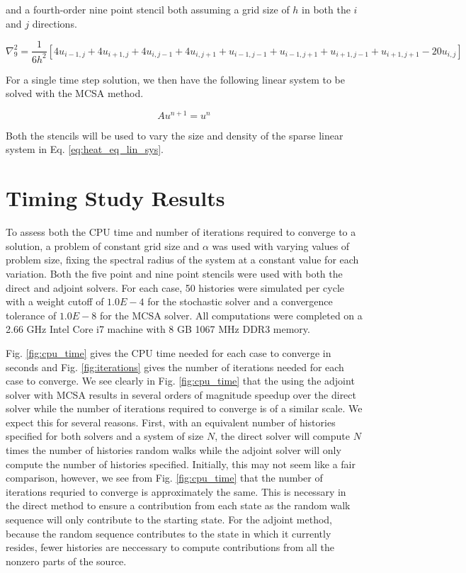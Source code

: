 \documentclass[note]{TechNote}
\begin{document}
and a fourth-order nine point stencil both assuming a grid size of $h$
in both the $i$ and $j$ directions.

\begin{equation}
  \nabla^2_9 = \frac{1}{6h^2}[4 u_{i-1,j} + 4 u_{i+1,j} + 4 u_{i,j-1}
    + 4 u_{i,j+1} + u_{i-1,j-1} + u_{i-1,j+1} + u_{i+1,j-1} +
    u_{i+1,j+1} - 20 u_{i,j}]
  \label{eq:nine_point_stencil}
\end{equation}

For a single time step solution, we then have the following linear
system to be solved with the MCSA method.

\begin{equation}
  A u^{n+1} = u^n
  \label{eq:heat_eq_lin_sys}
\end{equation}

Both the stencils will be used to vary the size and density of the
sparse linear system in Eq. \ref{eq:heat_eq_lin_sys}.

\section{Timing Study Results}
To assess both the CPU time and number of iterations required to
converge to a solution, a problem of constant grid size and $\alpha$
was used with varying values of problem size, fixing the spectral
radius of the system at a constant value for each variation. Both the
five point and nine point stencils were used with both the direct and
adjoint solvers. For each case, 50 histories were simulated per cycle
with a weight cutoff of $1.0E-4$ for the stochastic solver and a
convergence tolerance of $1.0E-8$ for the MCSA solver. All
computations were completed on a 2.66 GHz Intel Core i7 machine with 8
GB 1067 MHz DDR3 memory.

Fig. \ref{fig:cpu_time} gives the CPU time needed for each case to
converge in seconds and Fig. \ref{fig:iterations} gives the number of
iterations needed for each case to converge. We see clearly in
Fig. \ref{fig:cpu_time} that the using the adjoint solver with MCSA
results in several orders of magnitude speedup over the direct solver
while the number of iterations required to converge is of a similar
scale. We expect this for several reasons. First, with an equivalent
number of histories specified for both solvers and a system of size
$N$, the direct solver will compute $N$ times the number of histories
random walks while the adjoint solver will only compute the number of
histories specified. Initially, this may not seem like a fair
comparison, however, we see from Fig. \ref{fig:cpu_time} that the
number of iterations requried to converge is approximately the
same. This is necessary in the direct method to ensure a contribution
from each state as the random walk sequence will only contribute to
the starting state. For the adjoint method, because the random
sequence contributes to the state in which it currently resides, fewer
histories are neccessary to compute contributions from all the nonzero
parts of the source.
\end{document}
